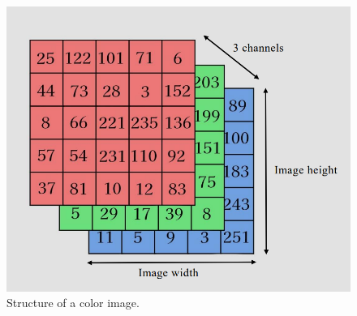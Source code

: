 \begin{figure}[h]
  \centering
  \includegraphics[width=90truemm]{resources/2_background/imagedata.png}
  \caption{
    Structure of a color image.
  }
  \label{structure-of-image}
\end{figure}



